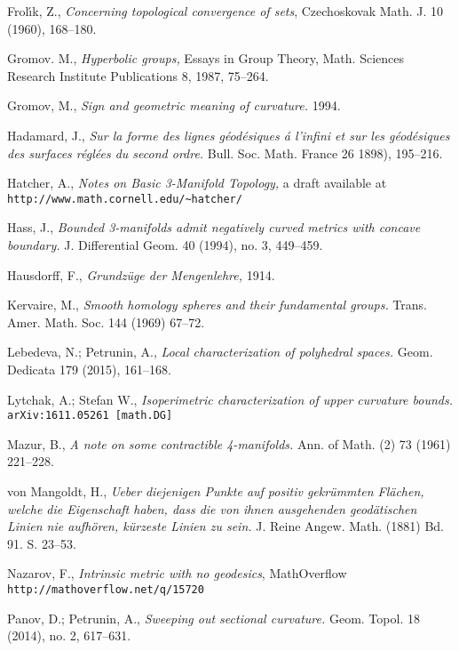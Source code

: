\begin{thebibliography}{52}
Frol\'{\i}k, Z., 
\textit{Concerning topological convergence of sets}, Czechoskovak Math. J. 
10 
(1960), 
168--180.

Gromov. M.,
\textit{Hyperbolic groups,} 
Essays in Group Theory,
Math. Sciences Research Institute Publications 8,
1987, 75--264.

Gromov, M.,
\textit{Sign and geometric meaning of curvature.}
1994.

Hadamard, J.,
\textit{Sur la forme des lignes g\'eod\'esiques \'a l'infini et sur les g\'eod\'esiques des surfaces r\'egl\'ees du second ordre.}
Bull. Soc. Math. France 
26 
1898), 
195--216.

Hatcher, A., 
\textit{Notes on Basic 3-Manifold Topology,}
a draft available at \verb+http://www.math.cornell.edu/~hatcher/+

Hass, J.,
\textit{Bounded 3-manifolds admit negatively curved metrics with concave boundary.}
J. Differential Geom. 
40 (1994), 
no. 3, 
449--459. 

Hausdorff, F., 
\textit{Grundz\"uge der Mengenlehre,} 
1914.

Kervaire, M., 
\textit{Smooth homology spheres and their fundamental groups.}
Trans. Amer. Math. Soc. 
144 
(1969) 
67--72.

Lebedeva, N.; 
Petrunin, A., 
\textit{Local characterization of polyhedral spaces.} Geom. Dedicata 179 (2015), 161--168.

Lytchak, A.; Stefan W.,
\textit{Isoperimetric characterization of upper curvature bounds.}
\texttt{arXiv:1611.05261 [math.DG]}

Mazur, B.,
\textit{A note on some contractible 4-manifolds.} 
Ann. of Math. (2) 
73 
(1961) 
221--228.

von Mangoldt, H., 
\textit{Ueber diejenigen Punkte auf positiv gekr\"ummten Fl\"achen, welche die Eigenschaft haben, dass die von ihnen ausgehenden geod\"atischen Linien nie aufh\"oren, k\"urzeste Linien zu sein.} 
J. Reine Angew. Math. (1881) Bd. 91. S. 23--53.

Nazarov, F.,
\textit{Intrinsic metric with no geodesics},
MathOverflow \texttt{http://mathoverflow.net/q/15720}

Panov, D.; Petrunin, A.,
\textit{Sweeping out sectional curvature.} 
Geom. Topol. 
18 
(2014), 
no. 2, 
617--631. 


\end{thebibliography}
